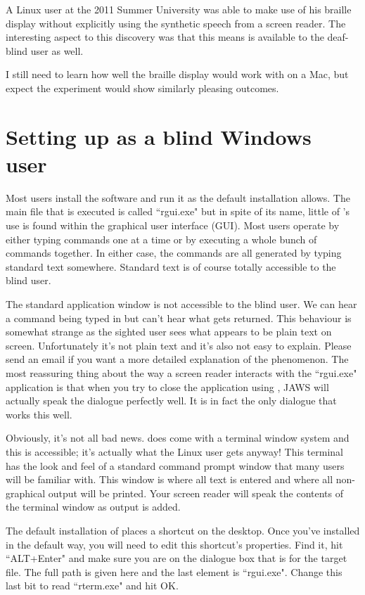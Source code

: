 A Linux user at the 2011 Summer University was able to make use of his braille display without explicitly using the synthetic speech from a screen reader. The interesting aspect to this discovery was that this means \R{} is available to the deaf-blind user as well.

I still need to learn how well the braille display would work with \R{} on a Mac, but expect the experiment would show similarly pleasing outcomes.

\section{Setting up \R{} as a blind Windows user}

Most \R{} users install the software and run it as the default installation allows. The main file that is executed is called ``rgui.exe" but in spite of its name, little of \R{}'s use is found within the graphical user interface (GUI). Most \R{} users operate by either typing commands one at a time or by executing a whole bunch of commands together. In either case, the commands are all generated by typing standard text somewhere. Standard text is of course totally accessible to the blind user.

The standard \R{} application window is not accessible to the blind user. We can hear a command being typed in but can't hear what gets returned. This behaviour is somewhat strange as the sighted user sees what appears to be plain text on screen. Unfortunately it's not plain text and it's also not easy to explain. Please send an email if you want a more detailed explanation of the phenomenon. The most reassuring thing about the way a screen reader interacts with the ``rgui.exe" application is that when you try to close the application using , JAWS will actually speak the dialogue perfectly well. It is in fact the only dialogue that works this well.

Obviously, it's not all bad news. \R{} does come with a terminal window system and this is accessible; it's actually what the Linux user gets anyway! This terminal has the look and feel of a standard command prompt window that many users will be familiar with. This window is where all text is entered and where all non-graphical output will be printed. Your screen reader will speak the contents of the terminal window as output is added.

The default installation of \R{} places a shortcut on the desktop. Once you've installed \R{} in the default way, you will need to edit this shortcut's properties. Find it, hit ``ALT+Enter" and make sure you are on the dialogue box that is for the target file. The full path is given here and the last element is ``rgui.exe". Change this last bit to read ``rterm.exe" and hit OK.

